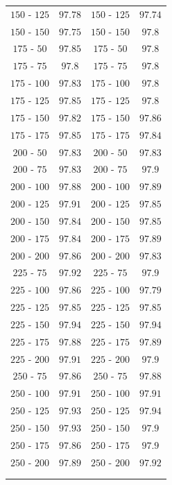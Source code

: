 \documentclass[11pt,a4paper,twoside,
openright]{book}
\begin{document}
\begin{center}
\begin{table}[]
\begin{center}
\begin{tabular}{@{}cc|cc@{}}
$150$ - $125$ & $97.78$  & $150$ - $125$ & $97.74$ \\ [1pt]
$150$ - $150$ & $97.75$  &  $150$ - $150$ & $97.8$ \\ [1pt]
$175$ - $50$ & $97.85$ &  $175$ - $50$ & $97.8$ \\ [1pt]
$175$ - $75$ & $97.8$ &  $175$ - $75$ & $97.8$ \\ [1pt]
$175$ - $100$ & $97.83$  &  $175$ - $100$ & $97.8$ \\ [1pt]
$175$ - $125$ & $97.85$  &  $175$ - $125$ & $97.8$ \\ [1pt]
$175$ - $150$ & $97.82$  & $175$ - $150$ & $97.86$ \\ [1pt]
$175$ - $175$ & $97.85$  & $175$ - $175$ & $97.84$ \\ [1pt]
$200$ - $50$ & $97.83$  &  $200$ - $50$ & $97.83$ \\ [1pt]
$200$ - $75$ & $97.83$ &  $200$ - $75$ & $97.9$ \\ [1pt]
$200$ - $100$ & $97.88$  & $200$ - $100$ & $97.89$ \\ [1pt]
$200$ - $125$ & $97.91$  & $200$ - $125$ & $97.85$ \\ [1pt]
$200$ - $150$ & $97.84$  & $200$ - $150$ & $97.85$ \\ [1pt]
$200$ - $175$ & $97.84$  & $200$ - $175$ & $97.89$ \\ [1pt]
$200$ - $200$ & $97.86$  & $200$ - $200$ & $97.83$ \\ [1pt]
$225$ - $75$ & $97.92$ &  $225$ - $75$ & $97.9$ \\ [1pt]
$225$ - $100$ & $97.86$  & $225$ - $100$ & $97.79$ \\ [1pt]
$225$ - $125$ & $97.85$  & $225$ - $125$ & $97.85$ \\ [1pt]
$225$ - $150$ & $97.94$  & $225$ - $150$ & $97.94$ \\ [1pt]
$225$ - $175$ & $97.88$  & $225$ - $175$ & $97.89$ \\ [1pt]
$225$ - $200$ & $97.91$  &  $225$ - $200$ & $97.9$ \\ [1pt]
$250$ - $75$ & $97.86$  &  $250$ - $75$ & $97.88$ \\ [1pt]
$250$ - $100$ & $97.91$  & $250$ - $100$ & $97.91$ \\ [1pt]
$250$ - $125$ & $97.93$  & $250$ - $125$ & $97.94$ \\ [1pt]
$250$ - $150$ & $97.93$  &  $250$ - $150$ & $97.9$ \\ [1pt]
$250$ - $175$ & $97.86$  &  $250$ - $175$ & $97.9$ \\ [1pt]
$250$ - $200$ & $97.89$  & $250$ - $200$ & $97.92$ \\ [1pt]
\hline\\[-11pt]
\hline\\[-8pt]
\end{tabular}\\[5pt]
\end{center}
\normalsize
\end{table}
\end{center}
\end{document}
